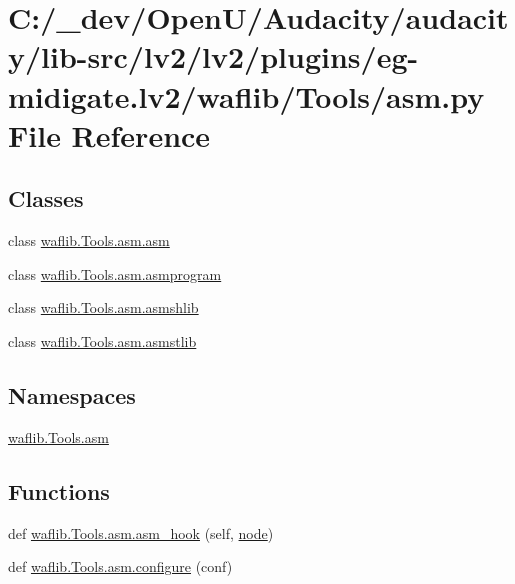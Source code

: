 \hypertarget{lv2_2plugins_2eg-midigate_8lv2_2waflib_2_tools_2asm_8py}{}\section{C\+:/\+\_\+dev/\+Open\+U/\+Audacity/audacity/lib-\/src/lv2/lv2/plugins/eg-\/midigate.lv2/waflib/\+Tools/asm.py File Reference}
\label{lv2_2plugins_2eg-midigate_8lv2_2waflib_2_tools_2asm_8py}
\subsection*{Classes}
\begin{DoxyCompactItemize}
\item 
class \hyperlink{classwaflib_1_1_tools_1_1asm_1_1asm}{waflib.\+Tools.\+asm.\+asm}
\item 
class \hyperlink{classwaflib_1_1_tools_1_1asm_1_1asmprogram}{waflib.\+Tools.\+asm.\+asmprogram}
\item 
class \hyperlink{classwaflib_1_1_tools_1_1asm_1_1asmshlib}{waflib.\+Tools.\+asm.\+asmshlib}
\item 
class \hyperlink{classwaflib_1_1_tools_1_1asm_1_1asmstlib}{waflib.\+Tools.\+asm.\+asmstlib}
\end{DoxyCompactItemize}
\subsection*{Namespaces}
\begin{DoxyCompactItemize}
\item 
 \hyperlink{namespacewaflib_1_1_tools_1_1asm}{waflib.\+Tools.\+asm}
\end{DoxyCompactItemize}
\subsection*{Functions}
\begin{DoxyCompactItemize}
\item 
def \hyperlink{namespacewaflib_1_1_tools_1_1asm_a287387dfaa8ffc9c35127be5128a185a}{waflib.\+Tools.\+asm.\+asm\+\_\+hook} (self, \hyperlink{structnode}{node})
\item 
def \hyperlink{namespacewaflib_1_1_tools_1_1asm_a223dd8eb9aca9f00c6758ed10833701a}{waflib.\+Tools.\+asm.\+configure} (conf)
\end{DoxyCompactItemize}
